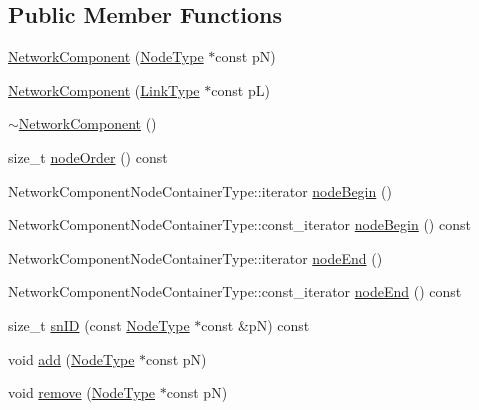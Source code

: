 \subsection*{Public Member Functions}
\begin{DoxyCompactItemize}
\item 
\hyperlink{classmodel_1_1_network_component_ab2564623a0dc42ad013002b893887e56}{Network\+Component} (\hyperlink{_network_typedefs_8h_a723f680c66f6a92647827790bcbafce0}{Node\+Type} $\ast$const p\+N)
\item 
\hyperlink{classmodel_1_1_network_component_a30ef6aaf02a5d5b694e8b0a80ef9842a}{Network\+Component} (\hyperlink{_spline_node_base__corder0_8h_ab09ccc0af6ea9402dfef7b0eac55cff3}{Link\+Type} $\ast$const p\+L)
\item 
\hyperlink{classmodel_1_1_network_component_ad61622fa38f7ff305ae83e707c5295f1}{$\sim$\+Network\+Component} ()
\item 
size\+\_\+t \hyperlink{classmodel_1_1_network_component_a9bc2542059f331138d4c00efbbe8064b}{node\+Order} () const 
\item 
Network\+Component\+Node\+Container\+Type\+::iterator \hyperlink{classmodel_1_1_network_component_a8dbc26e9d892368d7ad8901a5a7a667a}{node\+Begin} ()
\item 
Network\+Component\+Node\+Container\+Type\+::const\+\_\+iterator \hyperlink{classmodel_1_1_network_component_a72aca0957927dc8ca64076d9f670fa4c}{node\+Begin} () const 
\item 
Network\+Component\+Node\+Container\+Type\+::iterator \hyperlink{classmodel_1_1_network_component_a873619aae47567627ab095408069532b}{node\+End} ()
\item 
Network\+Component\+Node\+Container\+Type\+::const\+\_\+iterator \hyperlink{classmodel_1_1_network_component_acb822a3d70ad3679b0856ea2d6f62cf7}{node\+End} () const 
\item 
size\+\_\+t \hyperlink{classmodel_1_1_network_component_a29d5eedd8c6c98229bdda60911aaffe9}{sn\+I\+D} (const \hyperlink{_network_typedefs_8h_a723f680c66f6a92647827790bcbafce0}{Node\+Type} $\ast$const \&p\+N) const 
\item 
void \hyperlink{classmodel_1_1_network_component_ae29d1a96cd718362cee8c9b4d8435165}{add} (\hyperlink{_network_typedefs_8h_a723f680c66f6a92647827790bcbafce0}{Node\+Type} $\ast$const p\+N)
\item 
void \hyperlink{classmodel_1_1_network_component_ae9c3188960d8909c9118e3beec7183dc}{remove} (\hyperlink{_network_typedefs_8h_a723f680c66f6a92647827790bcbafce0}{Node\+Type} $\ast$const p\+N)

\end{DoxyCompactItemize}
